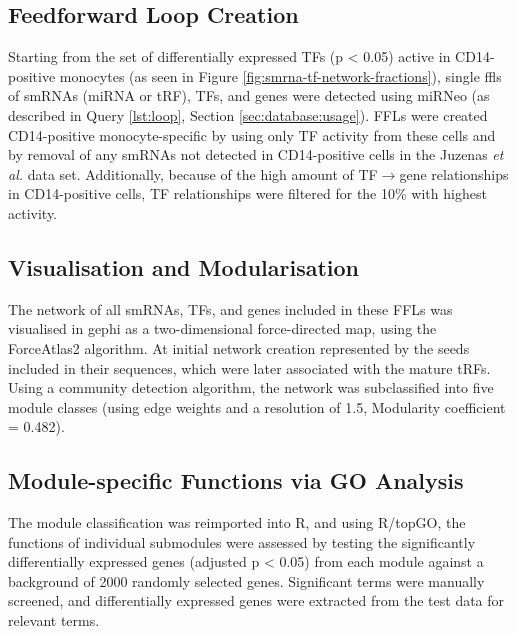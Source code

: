 \begin{method}

\subsection{Feedforward Loop Creation}
Starting from the set of differentially expressed TFs (p < 0.05) active in CD14-positive monocytes (as seen in Figure \ref{fig:smrna-tf-network-fractions}), single \acfp{ffl} of smRNAs (miRNA or tRF), TFs, and genes were detected using miRNeo (as described in Query \ref{lst:loop}, Section \ref{sec:database:usage}). FFLs were created CD14-positive monocyte-specific by using only TF activity from these cells and by removal of any smRNAs not detected in CD14-positive cells in the Juzenas \emph{et al.}\cite{Juzenas2017} data set. Additionally, because of the high amount of TF$\to$gene relationships in CD14-positive cells, TF relationships were filtered for the 10\% with highest activity.

\subsection{Visualisation and Modularisation}
The network of all smRNAs, TFs, and genes included in these FFLs was visualised in gephi\cite{Jacomy2014} as a two-dimensional force-directed map, using the ForceAtlas2 algorithm. At initial network creation represented by the seeds included in their sequences, which were later associated with the mature tRFs. Using a community detection algorithm\cite{Blondel2008}, the network was subclassified into five module classes (using edge weights and a resolution of 1.5, Modularity coefficient = 0.482).

\subsection{Module-specific Functions via GO Analysis}
 The module classification was reimported into R, and using R/topGO,\cite{Alexa2006} the functions of individual submodules were assessed by testing the significantly differentially expressed genes (adjusted p < 0.05) from each module against a background of 2000 randomly selected genes. Significant terms were manually screened, and differentially expressed genes were extracted from the test data for relevant terms.

\end{method}


